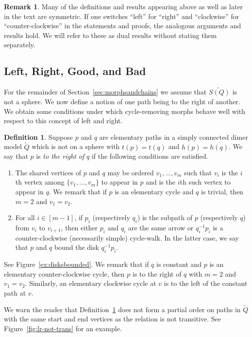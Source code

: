 \documentclass{article}
\theoremstyle{definition}
\newtheorem{defn}[thm]{Definition}
\newtheorem{remk}[thm]{Remark}
\begin{document}
\begin{remk}
    Many of the definitions and results appearing above as well as later in the text are symmetric. If one switches ``left'' for ``right'' and ``clockwise'' for ``counter-clockwise'' in the statements and proofs, the analogous arguments and results hold. We will refer to these as dual results without stating them separately.
\end{remk}

\subsection{Left, Right, Good, and Bad}

For the remainder of Section~\ref{sec:morphsandchains} we assume that $\widetilde{S(Q)}$ is not a sphere.  We now define a notion of one path being to the right of another.
We obtain some conditions under which cycle-removing morphs behave well with respect to this concept of left and right.


\begin{defn}\label{defn:left-right-disks-stuff}
	Suppose $p$ and $q$ are elementary paths in a simply connected dimer model ${\widetilde Q}$ which is not on a sphere with $t(p)=t(q)$ and $h(p)=h(q)$. We say that $p$ is \textit{to the right of} $q$ if the following conditions are satisfied. 
	\begin{enumerate}
		\item The shared vertices of $p$ and $q$ may be ordered $v_1,\dots,v_m$ such that $v_i$ is the $i$th vertex among $\{v_1,\dots,v_m\}$ to appear in $p$ and is the $i$th such vertex to appear in $q$. We remark that if $p$ is an elementary cycle and $q$ is trivial, then $m=2$ and $v_1=v_2$.
		\item For all $i\in[m-1]$, if $p_i$ (respectively $q_i$) is the subpath of $p$ (respectively $q$) from $v_i$ to $v_{i+1}$, then either $p_i$ and $q_i$ are the same arrow or $q_i^{-1}p_i$ is a counter-clockwise (necessarily simple) cycle-walk. In the latter case, we say that $p$ and $q$ bound the disk $q_i^{-1}p_i$.
	\end{enumerate}
	See Figure~\ref{ex:disksbounded}. We remark that if $q$ is constant and $p$ is an elementary counter-clockwise cycle, then $p$ is to the right of $q$ with $m=2$ and $v_1=v_2$. Similarly, an elementary clockwise cycle at $v$ is to the left of the constant path at $v$.
\end{defn}

We warn the reader that Definition~\ref{defn:left-right-disks-stuff} does not form a partial order on paths in $\widetilde Q$ with the same start and end vertices as the relation is not transitive. See Figure~\ref{fig:lr-not-trans} for an example.
\end{document}
